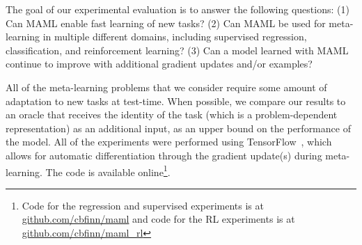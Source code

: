 \documentclass{article}
\begin{document}

The goal of our experimental evaluation is to answer the following questions: (1) Can MAML enable fast learning of new tasks? (2) Can MAML be used for meta-learning in multiple different domains, including supervised regression, classification, and reinforcement learning? (3) Can a model learned with MAML continue to improve with additional gradient updates and/or examples?

All of the meta-learning problems that we consider require some amount of adaptation to new tasks at test-time. When possible, we compare our results to an oracle that receives the identity of the task (which is a problem-dependent representation) as an additional input, as an upper bound on the performance of the model. All of the experiments were performed using TensorFlow~\cite{tensorflow}, which allows for automatic differentiation through the gradient update(s) during meta-learning. The code is available online\footnote{Code for the regression and supervised experiments is at \url{github.com/cbfinn/maml} and code for the RL experiments is at \url{github.com/cbfinn/maml_rl}}.
\end{document}
